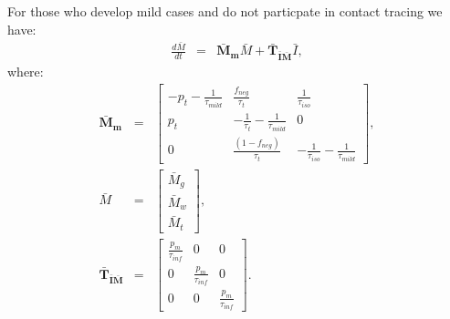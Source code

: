 \documentclass[notitlepage, superscriptaddress]{revtex4-2}
\begin{document}
For those who develop mild cases and do not particpate in contact tracing we have:
\begin{eqnarray}
\frac{d\bar{M}}{dt} &=& \boldsymbol{\bar{M}_{m}}  \bar{M} + \boldsymbol{\bar{T}_{\bar{I}\bar{M}}}  \bar{I}, 
\end{eqnarray}
where:
%
\begin{eqnarray}
\boldsymbol{\bar{M}_{m}} &=&
\begin{bmatrix}
- p_{t} -\frac{1}{\tau_{mild}}  &  \frac{f_{neg}}{\tau_{t}}            & \frac{1}{\tau_{iso}} \\ 
 p_{t}              & -\frac{1}{\tau_{t}} -\frac{1}{\tau_{mild}}       & 0  \\ 
 0                  & \frac{(1- f_{neg})}{\tau_{t}}                        & -\frac{1}{\tau_{iso}} -\frac{1}{\tau_{mild}}
\end{bmatrix}, \\ 
%
\bar{M} &=& 
\begin{bmatrix}
\bar{M}_{g} \\ \bar{M}_{w}\\ \bar{M}_{t}
\end{bmatrix}, \\ 
%
\boldsymbol{\bar{T}_{\bar{I}\bar{M}}}&=&
\begin{bmatrix}
\frac{p_{m}}{\tau_{inf}}  & 0                 & 0 \\ 
 0          &  \frac{p_{m}}{\tau_{inf}}  & 0 \\ 
 0          & 0                 &  \frac{p_{m}}{\tau_{inf}} 
\end{bmatrix}.
%
\end{eqnarray} 
\end{document}
